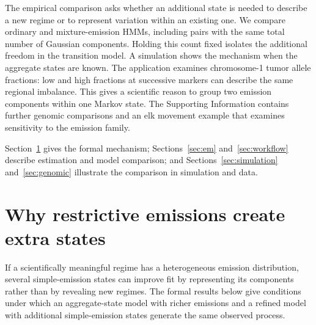 \documentclass[11pt]{article}
\theoremstyle{definition}
\begin{document}
The empirical comparison asks whether an additional state is needed to
describe a new regime or to represent variation within an existing one.
We compare ordinary and mixture-emission HMMs, including pairs with the
same total number of Gaussian components. Holding this count fixed isolates
the additional freedom in the transition model. A simulation shows the
mechanism when the aggregate states are known. The application examines
chromosome-1 tumor allele fractions: low and high fractions at successive
markers can describe the same regional imbalance. This gives a scientific
reason to group two emission components within one Markov state. The
Supporting Information contains further genomic comparisons and an elk
movement example that examines sensitivity to the emission family.

Section~\ref{sec:mechanism} gives the formal mechanism; Sections~\ref{sec:em}
and~\ref{sec:workflow} describe estimation and model comparison; and
Sections~\ref{sec:simulation} and~\ref{sec:genomic} illustrate the comparison in
simulation and data.

\section{Why restrictive emissions create extra states}\label{sec:mechanism}

If a scientifically meaningful regime has a heterogeneous emission distribution, several simple-emission
states can improve fit by representing its components rather than by revealing
new regimes. The formal results below give conditions under which an
aggregate-state model with richer emissions and a refined model with additional
simple-emission states generate the same observed process.
\end{document}
